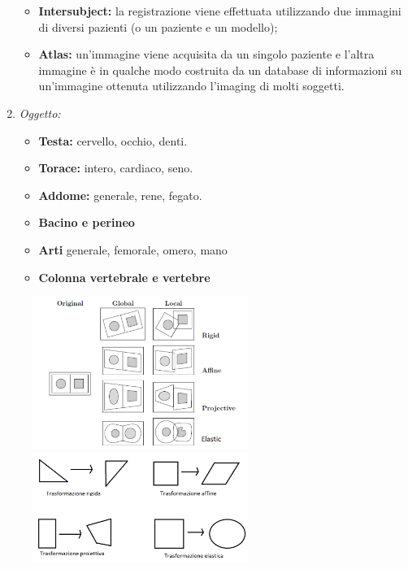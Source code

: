 \begin{enumerate}
\begin{itemize}
              \item \textbf{Intersubject:} la registrazione viene effettuata utilizzando due
                    immagini di diversi pazienti (o un paziente e un modello);
              \item \textbf{Atlas:} un'immagine viene acquisita da un singolo paziente e
                    l'altra immagine è in qualche modo costruita da un database
                    di informazioni su un'immagine ottenuta utilizzando l'imaging
                    di molti soggetti.
          \end{itemize}
    \item \textit{Oggetto:}
          \begin{itemize}
              \item \textbf{Testa:} cervello, occhio, denti.
              \item \textbf{Torace:} intero, cardiaco, seno.
              \item \textbf{Addome:} generale, rene, fegato.
              \item \textbf{Bacino e perineo}
              \item \textbf{Arti} generale, femorale, omero, mano
              \item \textbf{Colonna vertebrale e vertebre}
          \end{itemize}
\end{enumerate}

\begin{figure}[H]
    \centering
    \includegraphics[width=7cm, keepaspectratio]{capitoli/immagini/imgs/dominio.png}
    \includegraphics[width=7cm, keepaspectratio]{capitoli/immagini/imgs/tipi-trasformazione.png}
\end{figure}

